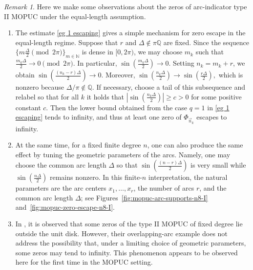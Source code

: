 \documentclass[a4paper,10pt,leqno]{amsart}
\numberwithin{equation}{section}
\theoremstyle{remark}
\newtheorem{remark}{Remark}
\begin{document}
\begin{remark}\label{remark MOPUC eg 1} Here we make some observations about the zeros of arc-indicator type II MOPUC under the equal-length assumption.  \phantom{newline}
\begin{enumerate}
\item The estimate \eqref{eg 1 escaping} gives a simple mechanism for zero escape in the equal-length regime. Suppose that $r$ and $\Delta \notin \pi \mathbb{Q}$ are fixed. Since the sequence
$
\{m\frac{\Delta}{2}\pmod {2\pi}\}_{ m\in\mathbb N}
$
is dense in $[0,2\pi)$, we may choose $m_k$ such that
$\frac{m_k\Delta}{2}\to 0 \pmod {2\pi}$. In particular, $
\sin\left(\frac{m_k\Delta}{2}\right)\to 0.
$
Setting $n_k=m_k+r$, we obtain
$
\sin\left(\frac{(n_k-r)\Delta}{2}\right)\to 0.
$
Moreover,
$
\sin\left(\frac{n_k\Delta}{2}\right)
\to
\sin\left(\frac{r\Delta}{2}\right),
$
which is nonzero because $\Delta/\pi\notin\mathbb Q$. If necessary, choose a tail of this subsequence and relabel so that for all $k$ it holds that $ \left|\sin\left(\frac{n_k\Delta}{2}\right)\right|\geq c>0$ for some positive constant $c$. Then the lower bound obtained from the case $q=1$ in \eqref{eg 1 escaping} tends to infinity, and thus at least one zero of $\Phi_{\vec n_k}$ escapes to infinity. 
\item At the same time, for a fixed finite degree $n$, one can also produce the same effect by tuning the geometric parameters of the arcs. Namely, one may choose the common arc length $\Delta$ so that $\sin\left(\frac{(n-r)\Delta}{2}\right)$ is very small while $\sin\left(\frac{n\Delta}{2}\right)$ remains nonzero. In this finite-$n$ interpretation, the natural parameters are the arc centers $x_1,\ldots,x_r$, the number of arcs $r$, and the common arc length $\Delta$;  see Figures~\ref{fig:mopuc-arc-supports-n8-I} and~\ref{fig:mopuc-zero-escape-n8-I}.
\item In \cite[Example~2]{MCVA08}, it is observed that some zeros of the
type II MOPUC of fixed degree lie outside the unit disk.  However, their
overlapping-arc example does not address the possibility that, under a
limiting choice of geometric parameters, some zeros may tend to infinity.
This phenomenon appears to be observed here for the first time in the MOPUC
setting.  
\end{enumerate}
\end{remark}
\end{document}
